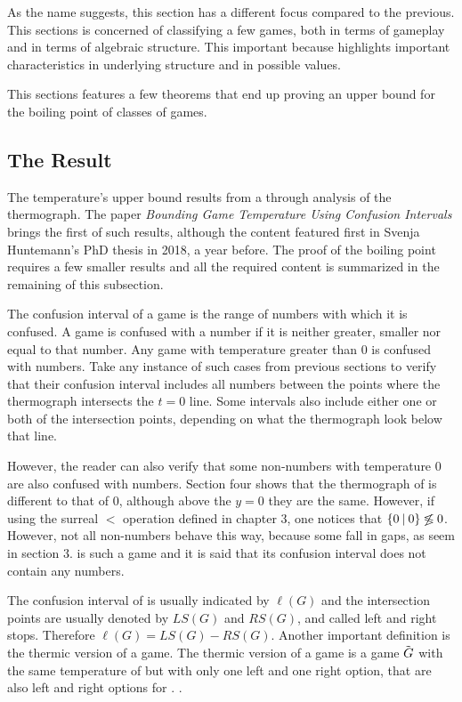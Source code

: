 As the name suggests, this section has a different focus compared to the previous. This sections is concerned of classifying a few games, both in terms of gameplay and in terms of algebraic structure. This important because highlights important characteristics in underlying structure and in possible values.

This sections features a few theorems that end up proving an upper bound for the boiling point of classes of games.

\subsection*{The Result}

The temperature's upper bound results from a through analysis of the thermograph. The paper \textit{Bounding Game Temperature Using Confusion
Intervals} \cite{12} brings the first of such results, although the content featured first in Svenja Huntemann's PhD thesis \cite{5} in 2018, a year before. The proof of the boiling point requires a few smaller results and all the required content is summarized in the remaining of this subsection.

The confusion interval of a game is the range of numbers with which it is confused. A game is confused with a number if it is neither greater, smaller nor equal to that number. Any game with temperature greater than 0 is confused with numbers. Take any instance of such cases from previous sections to verify that their confusion interval includes all numbers between the points where the thermograph intersects the $t=0$ line. Some intervals also include either one or both of the intersection points, depending on what the thermograph look below that line.

However, the reader can also verify that some non-numbers with temperature 0 are also confused with numbers. Section four shows that the thermograph of  is different to that of 0, although above the $y=0$ they are the same. However, if using the surreal $<$ operation defined in chapter 3, one notices that $\mbox{$\{0\:|\:0\}$} \not\lessgtr 0$. However, not all non-numbers behave this way, because some fall in gaps, as seem in section 3.  is such a game and it is said that its confusion interval does not contain any numbers.

The confusion interval of \Gm{} is usually indicated by $\ell(G)$ and the intersection points are usually denoted by $LS(G)$ and $RS(G)$, and called left and right stops. Therefore $\ell(G) = LS(G)-RS(G)$. Another important definition is the thermic version of a game. The thermic version of a game \Gm{} is a game $\tilde{\mbox{$G$}}$ with the same temperature of \Gm{} but with only one left and one right option, that are also left and right options for \Gm{}. .

